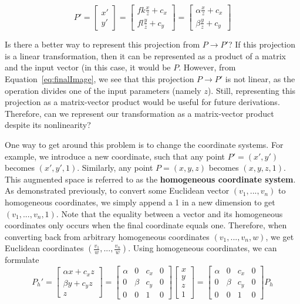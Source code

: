 \documentclass[a4paper, 12pt]{article}
\renewcommand\emph{\textbf}
\begin{document}
\begin{equation}
    P' = \begin{bmatrix}x'\\y'\end{bmatrix} = \begin{bmatrix}fk\frac{x}{z}+c_x \\ fl\frac{y}{z}+c_y\end{bmatrix} = \begin{bmatrix}\alpha\frac{x}{z}+c_x \\ \beta\frac{y}{z}+c_y\end{bmatrix}
    \label{eq:finalImage}
\end{equation}

Is there a better way to represent this projection from $P\rightarrow P'$? If this projection is a linear transformation, then it can be represented as a product of a matrix and the input vector (in this case, it would be $P$. However, from Equation~\ref{eq:finalImage}, we see that this projection $P\rightarrow P'$ is not linear, as the operation divides one of the input parameters (namely $z$). Still, representing this projection as a matrix-vector product would be useful for future derivations. Therefore, can we represent our transformation as a matrix-vector product despite its nonlinearity?

One way to get around this problem is to change the coordinate systems. For example, we introduce a new coordinate, such that any point $P' =(x',y')$ becomes $(x',y',1)$. Similarly, any point $P =(x,y,z)$ becomes $(x,y,z,1)$. This augmented space is referred to as the \emph{homogeneous coordinate system}. As demonstrated previously, to convert some Euclidean vector $(v_1,...,v_n)$ to homogeneous coordinates, we simply append a 1 in a new dimension to get $(v_1,...,v_n,1)$. Note that the equality between a vector and its homogeneous coordinates only occurs when the final coordinate equals one. Therefore, when converting back from arbitrary homogeneous coordinates $(v_1,  ... , v_n , w)$, we get Euclidean coordinates $(\frac{v_1}{w},...,\frac{v_n}{w})$. Using homogeneous coordinates, we can formulate
\begin{equation}
    P_h' = \begin{bmatrix}\alpha x + c_xz\\\beta y + c_yz \\ z\end{bmatrix} = 
    \begin{bmatrix}
    \alpha & 0 & c_x & 0\\
    0 & \beta & c_y & 0 \\ 
    0 & 0 & 1 & 0
    \end{bmatrix}
    \begin{bmatrix}x\\y\\z\\1\end{bmatrix} =     \begin{bmatrix}
    \alpha & 0 & c_x & 0\\
    0 & \beta & c_y & 0 \\ 
    0 & 0 & 1 & 0
    \end{bmatrix} P_h
    \label{eq:homogeneous}
\end{equation}
\end{document}
